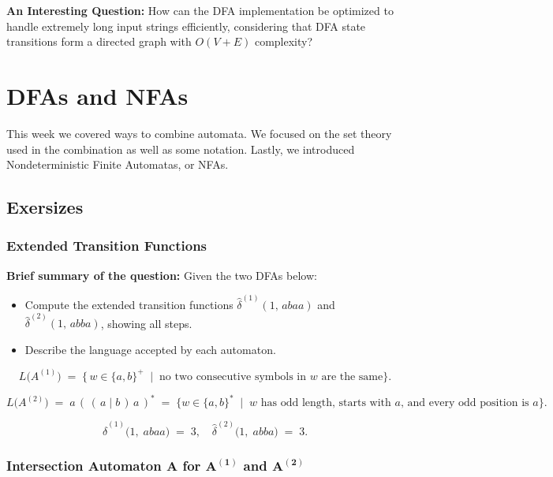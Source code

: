 \documentclass{article}
\begin{document}
\textbf{An Interesting Question:} How can the DFA implementation be optimized to handle extremely long input strings efficiently, considering that DFA state transitions form a directed graph with \( O(V + E) \) complexity?


\section{DFAs and NFAs}

This week we covered ways to combine automata. We focused on the set theory used in the combination as well as some notation.
Lastly, we introduced Nondeterministic Finite Automatas, or NFAs.

\subsection{Exersizes}

\subsubsection{Extended Transition Functions}
\textbf{Brief summary of the question:}
Given the two DFAs below:
\begin{itemize}
  \item Compute the extended transition functions 
    \(\hat\delta^{(1)}(1,\,abaa)\) and \(\hat\delta^{(2)}(1,\,abba)\), 
    showing all steps.
  \item Describe the language accepted by each automaton.
\end{itemize}

\[
  L\bigl(A^{(1)}\bigr) \;=\;
    \bigl\{\,
      w \in \{a,b\}^+
      \;\mid\;
      \text{no two consecutive symbols in $w$ are the same}
    \bigr\}.
\]

\[
  L\bigl(A^{(2)}\bigr) \;=\;
    a\,(\,(\,a \mid b\,)\,a\,)^{*}
  \;=\;
  \bigl\{
    w \in \{a,b\}^*
    \;\mid\;
    w \text{ has odd length, starts with $a$, and every odd position is $a$}
  \bigr\}.
\]

\[
  \hat{\delta}^{(1)}\bigl(1,\;abaa\bigr) \;=\; 3,
  \quad
  \hat{\delta}^{(2)}\bigl(1,\;abba\bigr) \;=\; 3.
\]

\subsubsection{%
  Intersection Automaton
    \texorpdfstring{\(\mathbf{A}\)}{A}
  for
    \texorpdfstring{\(\mathbf{A^{(1)}}\)}{A(1)}
  and
    \texorpdfstring{\(\mathbf{A^{(2)}}\)}{A(2)}
}
\end{document}
